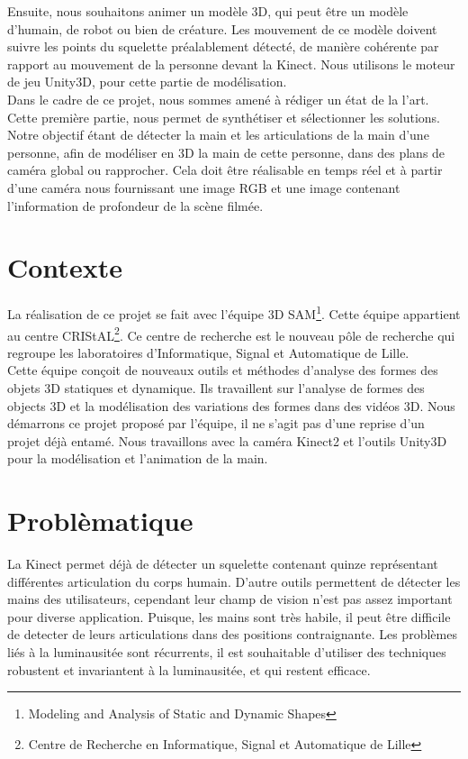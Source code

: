 Ensuite, nous souhaitons animer un modèle 3D, qui peut être un modèle 
d'humain, de robot ou bien de créature. Les mouvement de ce modèle 
doivent suivre les points du squelette préalablement détecté, de 
manière cohérente par rapport au mouvement de la personne devant la 
Kinect. Nous utilisons le moteur de jeu Unity3D, pour cette partie de 
modélisation.\\

Dans le cadre de ce projet, nous sommes amené à rédiger un état de la 
l'art. Cette première partie, nous permet de synthétiser et sélectionner 
les solutions. Notre objectif étant de détecter la main et les 
articulations de la main d'une personne, afin de modéliser en 3D la main 
de cette personne, dans des plans de caméra global ou rapprocher. Cela 
doit être réalisable en temps réel et à partir d'une caméra nous 
fournissant une image RGB et une image contenant l'information de 
profondeur de la scène filmée.\\

\section{Contexte}
La réalisation de ce projet se fait avec l'équipe 3D SAM\footnote{Modeling 
and Analysis of Static and Dynamic Shapes}. Cette équipe appartient au 
centre CRIStAL\footnote{Centre de Recherche en Informatique, 
Signal et Automatique de Lille}. Ce centre de recherche est le 
nouveau pôle de recherche qui regroupe les laboratoires d'Informatique, 
Signal et Automatique de Lille.\\


Cette équipe conçoit de 
nouveaux outils et méthodes d'analyse des formes des objets 3D statiques 
et dynamique. Ils travaillent sur l'analyse de formes des objects 3D et la 
modélisation des variations des formes dans des vidéos 3D. Nous démarrons 
ce projet proposé par l'équipe, il ne s'agit pas d'une reprise d'un projet 
déjà entamé. Nous travaillons avec la caméra Kinect2 et l'outils Unity3D 
pour la modélisation et l'animation de la main.

\section{Problèmatique}
La Kinect permet déjà de détecter un squelette contenant quinze représentant 
différentes articulation du corps humain. 
D'autre outils permettent de détecter les mains des utilisateurs, cependant leur
champ de vision n'est pas assez important pour diverse application.
Puisque, 
les mains sont très habile, il peut être difficile de detecter de leurs 
articulations dans des positions contraignante. Les problèmes liés à 
la luminausitée sont récurrents, il est souhaitable d'utiliser des 
techniques robustent et invariantent à la luminausitée, et qui restent 
efficace.

